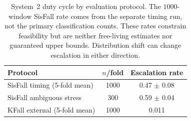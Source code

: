 \begin{table}[!t]
\centering
\caption{System~2 duty cycle by evaluation protocol. The $1000$-window SisFall rate comes from the separate timing run, not the primary classification counts. These rates constrain feasibility but are neither free-living estimates nor guaranteed upper bounds. Distribution shift can change escalation in either direction.}
\label{tab:escalation}
\begin{tabular}{lcc}
\toprule
Protocol & $n$/fold & Escalation rate \\
\midrule
SisFall timing (5-fold mean)    & 1000 & 0.47 $\pm$ 0.08 \\
SisFall ambiguous stress        & 300  & 0.59 $\pm$ 0.04 \\
KFall external (5-fold mean)    & 1000 & 0.011 \\
\bottomrule
\end{tabular}
\end{table}
